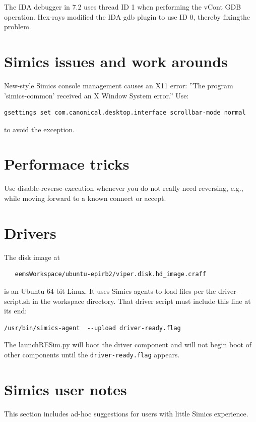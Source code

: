 \documentclass[titlepage]{article}
\begin{document}
The IDA debugger in 7.2 uses thread ID 1 when performing the vCont GDB operation.  Hex-rays modified the IDA gdb plugin to
use ID 0, thereby fixingthe problem.

\section{Simics issues and work arounds}
New-style Simics console management causes an X11 error: ''The program 'simics-common' received an X Window System error.''
Use:
\begin{verbatim}
gsettings set com.canonical.desktop.interface scrollbar-mode normal
\end{verbatim}
\noindent to avoid the exception.

\section{Performace tricks}
Use disable-reverse-execution whenever you do not really need reversing, e.g., while moving forward to a known connect or accept.

\section{Drivers}
The disk image at 
\begin{verbatim}
   eemsWorkspace/ubuntu-epirb2/viper.disk.hd_image.craff
\end{verbatim}
\noindent is an Ubuntu 64-bit Linux.  It uses Simics agents to load files per the driver-script.sh in the workspace directory.
That driver script must include this line at its end:
\begin{verbatim}
/usr/bin/simics-agent  --upload driver-ready.flag
\end{verbatim}
The launchRESim.py will boot the driver component and will not begin boot of other components until the {\tt driver-ready.flag} appears.

\section{Simics user notes}
This section includes ad-hoc suggestions for users with little Simics experience.
\end{document}

